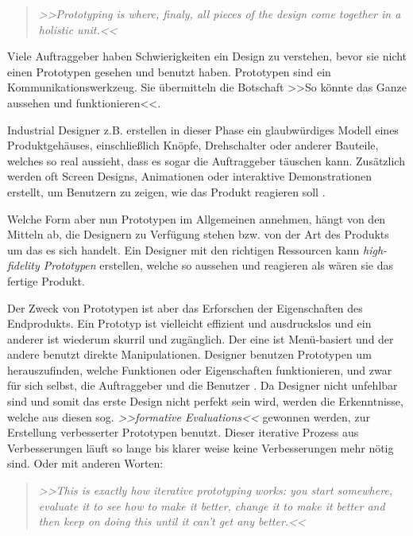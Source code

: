 \begin{quote}
	\textsl{>>Prototyping is where, finaly, all pieces of the design come together in a holistic unit.<<}
\begin{flushright}\citep{Saffer:2007}\end{flushright}
\end{quote}

Viele Auftraggeber haben Schwierigkeiten ein Design zu verstehen, bevor sie nicht einen Prototypen gesehen und benutzt haben. Prototypen sind ein Kommunikationswerkzeug. Sie übermitteln die Botschaft >>So könnte das Ganze aussehen und funktionieren<<.

\medskip Industrial Designer z.B. erstellen in dieser Phase ein glaubwürdiges Modell eines Produktgehäuses, einschließlich Knöpfe, Drehschalter oder anderer Bauteile, welches so real aussieht, dass es sogar die Auftraggeber täuschen kann. Zusätzlich werden oft Screen Designs, Animationen oder interaktive Demonstrationen erstellt, um Benutzern zu zeigen, wie das Produkt reagieren soll \citep{Vertelney:1990}.

\medskip Welche Form aber nun Prototypen im Allgemeinen annehmen, hängt von den Mitteln ab, die Designern zu Verfügung stehen bzw. von der Art des Produkts um das es sich handelt. Ein Designer mit den richtigen Ressourcen kann \emph{high-fidelity Prototypen} erstellen, welche so aussehen und reagieren als wären sie das fertige Produkt.

Der Zweck von Prototypen ist aber das Erforschen der Eigenschaften des Endprodukts. Ein Prototyp ist vielleicht effizient und ausdruckslos und ein anderer ist wiederum skurril und zugänglich. Der eine ist Menü-basiert und der andere benutzt direkte Manipulationen. Designer benutzen Prototypen um herauszufinden, welche Funktionen oder Eigenschaften funktionieren, und zwar für sich selbst, die Auftraggeber und die Benutzer \citep{Saffer:2007}. Da Designer nicht unfehlbar sind und somit das erste Design nicht perfekt sein wird, werden die Erkenntnisse, welche aus diesen sog. \emph{>>formative Evaluations<<} gewonnen werden, zur Erstellung verbesserter Prototypen benutzt. Dieser iterative Prozess aus Verbesserungen läuft so lange bis klarer weise keine Verbesserungen mehr nötig sind. Oder mit anderen Worten: 

\begin{quote}
	\textsl{>>This is exactly how iterative prototyping works: you start somewhere, evaluate it to see how to make it better, change it to make it better and then keep on doing this until it can't get any better.<<}
\begin{flushright}\citep{Dix:2004}\end{flushright}
\end{quote}

